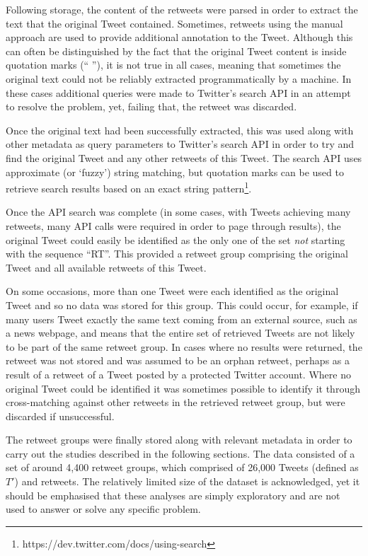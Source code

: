 Following storage, the content of the retweets were parsed in order to extract the text that the original Tweet contained. Sometimes, retweets using the manual approach are used to provide additional annotation to the Tweet. Although this can often be distinguished by the fact that the original Tweet content is inside quotation marks (`` ''), it is not true in all cases, meaning that sometimes the original text could not be reliably extracted programmatically by a machine. In these cases additional queries were made to Twitter's search API in an attempt to resolve the problem, yet, failing that, the retweet was discarded.

Once the original text had been successfully extracted, this was used along with other metadata as query parameters to Twitter's search API in order to try and find the original Tweet and any other retweets of this Tweet. The search API uses approximate (or `fuzzy') string matching, but quotation marks can be used to retrieve search results based on an exact string pattern\footnote{https://dev.twitter.com/docs/using-search}.

Once the API search was complete (in some cases, with Tweets achieving many retweets, many API calls were required in order to page through results), the original Tweet could easily be identified as the only one of the set \textit{not} starting with the sequence ``RT''. This provided a retweet group comprising the original Tweet and all available retweets of this Tweet.

On some occasions, more than one Tweet were each identified as the original Tweet and so no data was stored for this group. This could occur, for example, if many users Tweet exactly the same text coming from an external source, such as a news webpage, and means that the entire set of retrieved Tweets are not likely to be part of the same retweet group. In cases where no results were returned, the retweet was not stored and was assumed to be an orphan retweet, perhaps as a result of a retweet of a Tweet posted by a protected Twitter account. Where no original Tweet could be identified it was sometimes possible to identify it through cross-matching against other retweets in the retrieved retweet group, but were discarded if unsuccessful.

The retweet groups were finally stored along with relevant metadata in order to carry out the studies described in the following sections. The data consisted of a set of around 4,400 retweet groups, which comprised of 26,000 Tweets (defined as $T'$)  and retweets. The relatively limited size of the dataset is acknowledged, yet it should be emphasised that these analyses are simply exploratory and are not used to answer or solve any specific problem.


